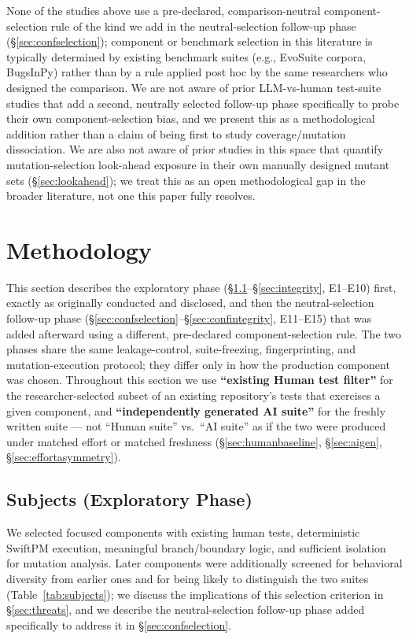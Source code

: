 \documentclass[10pt,conference]{IEEEtran}
\begin{document}
None of the studies above use a pre-declared, comparison-neutral component-selection rule of the kind we add in the neutral-selection follow-up phase (\S\ref{sec:confselection}); component or benchmark selection in this literature is typically determined by existing benchmark suites (e.g., EvoSuite corpora, BugsInPy) rather than by a rule applied post hoc by the same researchers who designed the comparison. We are not aware of prior LLM-vs-human test-suite studies that add a second, neutrally selected follow-up phase specifically to probe their own component-selection bias, and we present this as a methodological addition rather than a claim of being first to study coverage/mutation dissociation. We are also not aware of prior studies in this space that quantify mutation-selection look-ahead exposure in their own manually designed mutant sets (\S\ref{sec:lookahead}); we treat this as an open methodological gap in the broader literature, not one this paper fully resolves.

\section{Methodology}
\label{sec:methodology}

This section describes the exploratory phase (\S\ref{sec:subjects}--\S\ref{sec:integrity}, E1--E10) first, exactly as originally conducted and disclosed, and then the neutral-selection follow-up phase (\S\ref{sec:confselection}--\S\ref{sec:confintegrity}, E11--E15) that was added afterward using a different, pre-declared component-selection rule. The two phases share the same leakage-control, suite-freezing, fingerprinting, and mutation-execution protocol; they differ only in how the production component was chosen. Throughout this section we use \textbf{``existing Human test filter''} for the researcher-selected subset of an existing repository's tests that exercises a given component, and \textbf{``independently generated AI suite''} for the freshly written suite — not ``Human suite'' vs.\ ``AI suite'' as if the two were produced under matched effort or matched freshness (\S\ref{sec:humanbaseline}, \S\ref{sec:aigen}, \S\ref{sec:effortasymmetry}).

\subsection{Subjects (Exploratory Phase)}
\label{sec:subjects}
We selected focused components with existing human tests, deterministic SwiftPM execution, meaningful branch/boundary logic, and sufficient isolation for mutation analysis. Later components were additionally screened for behavioral diversity from earlier ones and for being likely to distinguish the two suites (Table~\ref{tab:subjects}); we discuss the implications of this selection criterion in \S\ref{sec:threats}, and we describe the neutral-selection follow-up phase added specifically to address it in \S\ref{sec:confselection}.
\end{document}
